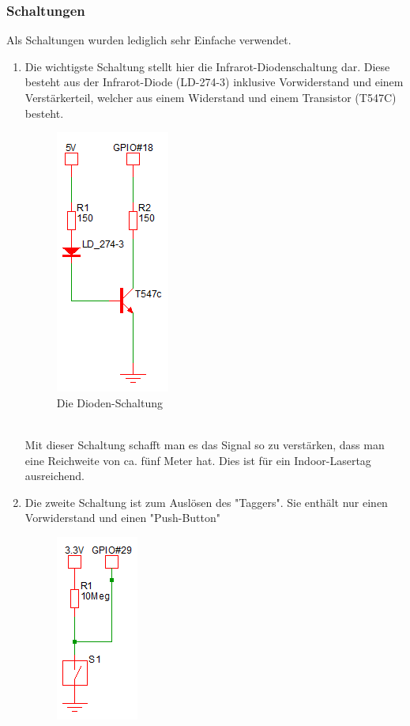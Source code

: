 \newpage
\subsubsection{Schaltungen}

Als Schaltungen wurden lediglich sehr Einfache verwendet. 
\begin{enumerate}
	\item Die wichtigste Schaltung stellt hier die Infrarot-Diodenschaltung dar. Diese besteht aus der Infrarot-Diode (LD-274-3) inklusive Vorwiderstand und einem Verstärkerteil, welcher aus einem Widerstand und einem Transistor (T547C) besteht.\\
	\begin{figure}[h]
		\centering
		\includegraphics[width=0.2 \textwidth]{./040-komponenten/010-hardware/Diodenschaltung.png}
		\caption{Die Dioden-Schaltung}
		\label{fig:Bild2Hardware}
	\end{figure}\\
	Mit dieser Schaltung schafft man es das Signal so zu verstärken, dass man eine Reichweite von ca. fünf Meter hat. Dies ist für ein Indoor-Lasertag ausreichend.\\
	\item Die zweite Schaltung ist zum Auslösen des "Taggers". Sie enthält nur einen Vorwiderstand und einen "Push-Button"\\
	\begin{figure}[h]
		\centering
		\includegraphics[with=0.2 \textwidth]{./040-komponenten/010-hardware/button.png}

\end{figure}
\end{enumerate}
